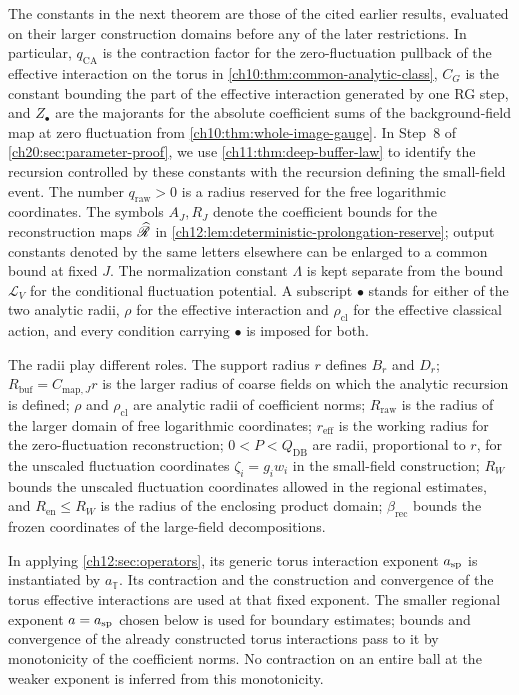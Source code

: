 The constants in the next theorem are those of the cited earlier results, evaluated on their larger construction domains before any of the later restrictions. In particular, $q_{\mathrm{CA}}$ is the contraction factor for the zero-fluctuation pullback of the effective interaction on the torus in \cref{ch10:thm:common-analytic-class}, $C_G$ is the constant bounding the part of the effective interaction generated by one RG step, and $Z_\bullet$ are the majorants for the absolute coefficient sums of the background-field map at zero fluctuation from \cref{ch10:thm:whole-image-gauge}. In Step~8 of \cref{ch20:sec:parameter-proof}, we use \cref{ch11:thm:deep-buffer-law} to identify the recursion controlled by these constants with the recursion defining the small-field event. The number $q_{\mathrm{raw}}>0$ is a radius reserved for the free logarithmic coordinates. The symbols $A_J,R_J$ denote the coefficient bounds for the reconstruction maps $\widehat{\mathscr R}$ in \cref{ch12:lem:deterministic-prolongation-reserve}; output constants denoted by the same letters elsewhere can be enlarged to a common bound at fixed $J$. The normalization constant $\Lambda$ is kept separate from the bound $\mathcal L_V$ for the conditional fluctuation potential. A subscript $\bullet$ stands for either of the two analytic radii, $\rho$ for the effective interaction and $\rho_{\mathrm{cl}}$ for the effective classical action, and every condition carrying $\bullet$ is imposed for both.

The radii play different roles. The support radius $r$ defines $B_r$ and $D_r$; $R_{\mathrm{buf}}=C_{\mathrm{map},J}r$ is the larger radius of coarse fields on which the analytic recursion is defined; $\rho$ and $\rho_{\mathrm{cl}}$ are analytic radii of coefficient norms; $R_{\mathrm{raw}}$ is the radius of the larger domain of free logarithmic coordinates; $r_{\mathrm{eff}}$ is the working radius for the zero-fluctuation reconstruction; $0<P<Q_{\mathrm{DB}}$ are radii, proportional to $r$, for the unscaled fluctuation coordinates $\zeta_i=g_iw_i$ in the small-field construction; $R_W$ bounds the unscaled fluctuation coordinates allowed in the regional estimates, and $R_{\mathrm{en}}\le R_W$ is the radius of the enclosing product domain; $\beta_{\mathrm{rec}}$ bounds the frozen coordinates of the large-field decompositions.

In applying \cref{ch12:sec:operators}, its generic torus interaction exponent $a_{\mathrm{sp}}$ is instantiated by $a_{\mathbb T}$. Its contraction and the construction and convergence of the torus effective interactions are used at that fixed exponent. The smaller regional exponent $a=a_{\mathrm{sp}}$ chosen below is used for boundary estimates; bounds and convergence of the already constructed torus interactions pass to it by monotonicity of the coefficient norms. No contraction on an entire ball at the weaker exponent is inferred from this monotonicity.

